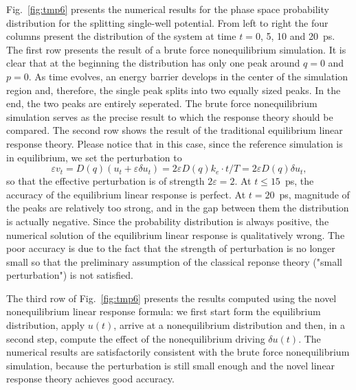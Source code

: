 \documentclass[]{tMPH2e}
\newcommand{\eps}{\varepsilon}
\newcommand{\mt}{\mathcal T}
\begin{document}
Fig.~\ref{fig:tmp6} presents the numerical results for  the phase space probability distribution for the splitting
single-well potential. From left to right the four columns present the
distribution of the system at time $t = 0$, 5, 10 and 20~\textsf{ps}. The first
row presents the result of a brute force nonequilibrium simulation.  It is clear
that at the beginning the distribution has only one peak around $q = 0$ and $p = 0$. As  time evolves, an energy barrier develops
in the center of the simulation region and, therefore, the single peak
splits into two equally sized peaks.  In the end, the two
peaks are entirely seperated.  The brute force nonequilibrium
simulation serves as the precise result to which the response theory
should be compared. The second row shows the result of the
traditional equilibrium linear response theory.  Please notice that in
this case, since the reference simulation is in equilibrium, we set the perturbation to
\[
\eps v_t = D(q) (u_t+\eps\delta u_t)=2\eps D(q)k_e\cdot t/T=2\eps D(q)\delta u_t,
\] 
so that the effective perturbation is of strength $2\eps = 2$.  At $t \leq
15$~\textsf{ps}, the accuracy of the equilibrium linear response is
perfect. At $t =
20$~\textsf{ps}, magnitude of the peaks are relatively too strong,
and in the gap between them the distribution is actually negative.
Since the probability distribution is always positive, the
numerical solution of the equilibrium linear response is qualitatively wrong.
The poor accuracy is due to the fact that the strength of perturbation is no
longer small so that the preliminary assumption of the classical reponse theory ("small perturbation")
is not satisfied.  

The third row of Fig.~\ref{fig:tmp6} presents the results computed using the novel nonequilibrium  linear response formula: we first start form the equilibrium distribution, apply  $u(t)$, arrive at a nonequilibrium distribution and then, in a second step, compute the effect of the nonequilibrium driving $\delta u(t)$.  The numerical results are satisfactorily consistent with
the brute force nonequilibrium simulation, because the perturbation is still  small enough and the novel linear response theory achieves
good accuracy.

\end{document}
